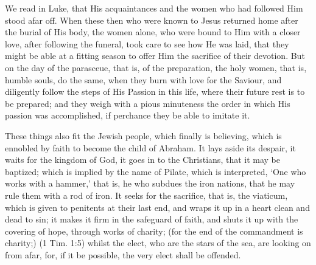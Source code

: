  We read in Luke, that His acquaintances and the women who had followed Him stood afar off. When these then who were known to Jesus returned home after the burial of His body, the women alone, who were bound to Him with a closer love, after following the funeral, took care to see how He was laid, that they might be able at a fitting season to offer Him the sacrifice of their devotion. But on the day of the parasceue, that is, of the preparation, the holy women, that is, humble souls, do the same, when they burn with love for the Saviour, and diligently follow the steps of His Passion in this life, where their future rest is to be prepared; and they weigh with a pious minuteness the order in which His passion was accomplished, if perchance they be able to imitate it.

 These things also fit the Jewish people, which finally is believing, which is ennobled by faith to become the child of Abraham. It lays aside its despair, it waits for the kingdom of God, it goes in to the Christians, that it may be baptized; which is implied by the name of Pilate, which is interpreted, ‘One who works with a hammer,’ that is, he who subdues the iron nations, that he may rule them with a rod of iron. It seeks for the sacrifice, that is, the viaticum, which is given to penitents at their last end, and wraps it up in a heart clean and dead to sin; it makes it firm in the safeguard of faith, and shuts it up with the covering of hope, through works of charity; (for the end of the commandment is charity;) (1 Tim. 1:5) whilst the elect, who are the stars of the sea, are looking on from afar, for, if it be possible, the very elect shall be offended.


 

